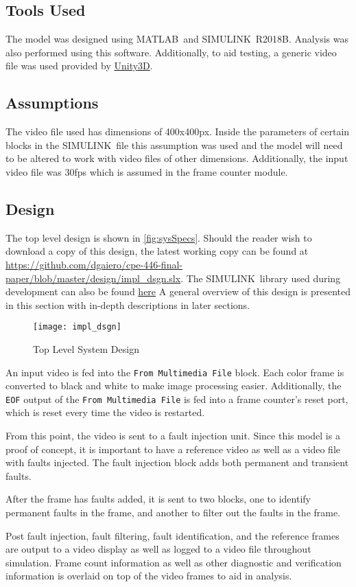 \subsection{Tools Used}
The model was designed using MATLAB\textregisteredmark\ and SIMULINK\textregisteredmark\ R2018B. Analysis was also performed using this software. Additionally, to aid testing, a generic video file was used provided by \hyperlink{https://blogs.unity3d.com/2016/11/28/free-vfx-image-sequences-flipbooks/}{Unity3D}.
\subsection{Assumptions}
The video file used has dimensions of 400x400px. Inside the parameters of certain blocks in the SIMULINK\textregisteredmark\ file this assumption was used and the model will need to be altered to work with video files of other dimensions. Additionally, the input video file was 30fps which is assumed in the frame counter module.
\subsection{Design}
The top level design is shown in \autoref{fig:sysSpecs}. Should the reader wish to download a copy of this design, the latest working copy can be found at \hyperlink{https://github.com/dgaiero/cpe-446-final-paper/blob/master/design/impl_dsgn.slx}{https://github.com/dgaiero/cpe-446-final-paper/blob/master/design/impl\_dsgn.slx}. The SIMULINK\textregisteredmark\ library used during development can also be found \hyperlink{https://github.com/dgaiero/cpe-446-final-paper/blob/master/design/library.slx}{here} A general overview of this design is presented in this section with in-depth descriptions in later sections.
\begin{figure*}
    \texttt{[image: impl\_dsgn]}
    \caption{Top Level System Design}
    \label{fig:sysSpecs}
\end{figure*}
\medskip
\par An input video is fed into the \verb!From Multimedia File! block. Each color frame is converted to black and white to make image processing easier. Additionally, the \verb!EOF! output of the \verb!From Multimedia File! is fed into a frame counter's reset port, which is reset every time the video is restarted.
\par From this point, the video is sent to a fault injection unit. Since this model is a proof of concept, it is important to have a reference video as well as a video file with faults injected. The fault injection block adds both permanent and transient faults.
\par After the frame has faults added, it is sent to two blocks, one to identify permanent faults in the frame, and another to filter out the faults in the frame.
\par Post fault injection, fault filtering, fault identification, and the reference frames are output to a video display as well as logged to a video file throughout simulation. Frame count information as well as other diagnostic and verification information is overlaid on top of the video frames to aid in analysis.
